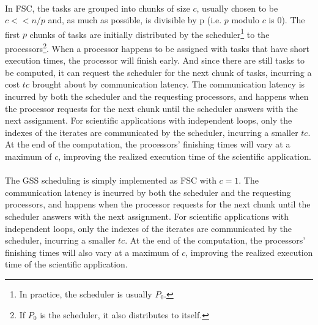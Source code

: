 \documentclass[10pt, twocolumn, letterpaper]{article}
\begin{document}
\paragraph{}
In FSC, the tasks are grouped into chunks of size $c$, usually chosen to be $c<<n/p$ and, as much as possible, is divisible by p (i.e. $p$ modulo $c$ is 0). The first $p$ chunks of tasks are initially distributed by the scheduler\footnote{In practice, the scheduler is usually $P_0$.} to the processors\footnote{If $P_0$ is the scheduler, it also distributes to itself.}. When a processor happens to be assigned with tasks that have short execution times, the processor will finish early. And since there are still tasks to be computed, it can request the scheduler for the next chunk of tasks, incurring a cost $tc$ brought about by communication latency. The communication latency is incurred by both the scheduler and the requesting processors, and happens when the processor requests for the next chunk until the scheduler answers with the next assignment. For scientific applications with independent loops, only the indexes of the iterates are communicated by the scheduler, incurring a smaller $tc$. At the end of the computation, the processors’ finishing times will vary at a maximum of $c$, improving the realized execution time of the scientific application.

\paragraph{}
The GSS scheduling is simply implemented as FSC with $c=1$. The communication latency is incurred by both the scheduler and the requesting processors, and happens when the processor requests for the next chunk until the scheduler answers with the next assignment. For scientific applications with independent loops, only the indexes of the iterates are communicated by the scheduler, incurring a smaller $tc$. At the end of the computation, the processors’ finishing times will also vary at a maximum of $c$, improving the realized execution time of the scientific application.
\end{document}
